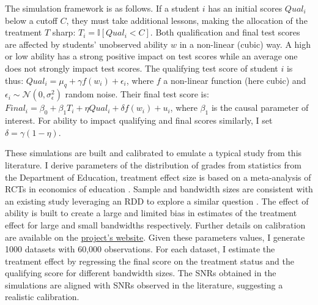 \documentclass[usletter, 12pt]{article}
\begin{document}
        			 The simulation framework is as follows. If a student $i$ has an initial scores $Qual_{i}$ below a cutoff $C$, they must take additional lessons, making the allocation of the treatment $T$ sharp: $T_i = \mathbb{I}[Qual_{i} < C]$. Both qualification and final test scores are affected by students' unobserved ability $w$ in a non-linear (cubic) way. A high or low ability has a strong positive impact on test scores while an average one does not strongly impact test scores. The qualifying test score of student $i$ is thus: $Qual_{i} = \mu_q + \gamma f(w_i) + \epsilon_{i}$, where $f$ a non-linear function (here cubic) and $\epsilon_{i} \sim \mathcal{N}(0, \sigma_{\epsilon}^{2})$ random noise. Their final test score is: $Final_{i} = \beta_{0} + \beta_{1} T_i + \eta Qual_{i} +  \delta f(w_i) + u_{i}$, where $\beta_{1}$ is the causal parameter of interest. For ability to impact qualifying and final scores similarly, I set $\delta = \gamma (1 - \eta)$.
        
        			These simulations are built and calibrated to emulate a typical study from this literature. I derive parameters of the distribution of grades from statistics from the Department of Education,  treatment effect size is based on a meta-analysis of RCTs in economics of education  \citep{kraft_interpreting_2020}. Sample and bandwidth sizes are consistent with an existing study leveraging an RDD to explore a similar question \citep{jacob_remedial_2004}. The effect of ability is built to create a large and limited bias in estimates of the treatment effect for large and small bandwidths respectively. Further details on calibration are available on the \href{https://vincentbagilet.github.io/causal_exaggeration/RDD.html#calibration-and-baseline-parameters-values}{project's website}. Given these parameters values, I generate 1000 datasets with 60,000 observations. For each dataset, I estimate the treatment effect by regressing the final score on the treatment status and the qualifying score for different bandwidth sizes. The SNRs obtained in the simulations are aligned with SNRs observed in the literature, suggesting a realistic calibration.
				
\end{document}

